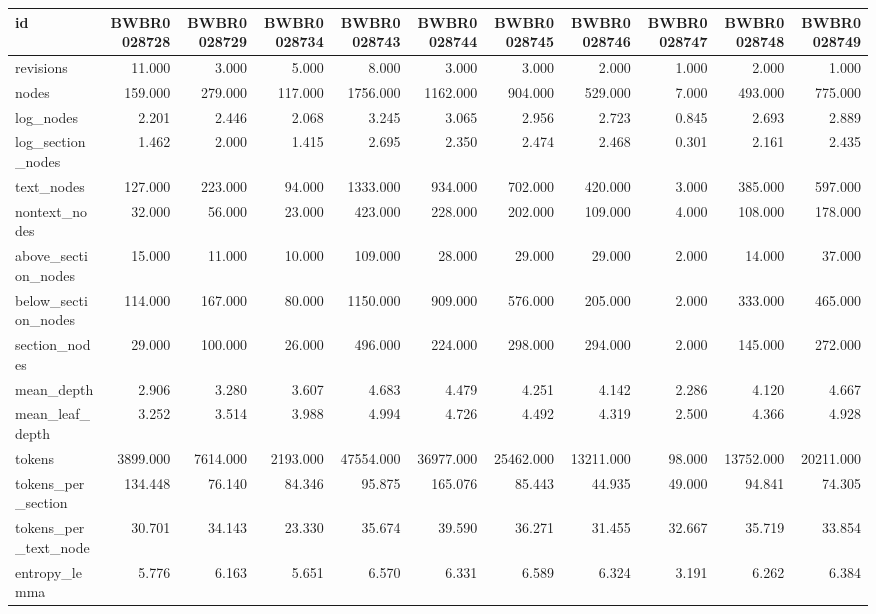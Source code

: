 \begin{tabular}{lrrrrrrrrrr}
\toprule
id & BWBR0028728 & BWBR0028729 & BWBR0028734 & BWBR0028743 & BWBR0028744 & BWBR0028745 & BWBR0028746 & BWBR0028747 & BWBR0028748 & BWBR0028749 \\
\midrule
revisions & 11.000 & 3.000 & 5.000 & 8.000 & 3.000 & 3.000 & 2.000 & 1.000 & 2.000 & 1.000 \\
\cline{1-11}
nodes & 159.000 & 279.000 & 117.000 & 1756.000 & 1162.000 & 904.000 & 529.000 & 7.000 & 493.000 & 775.000 \\
\cline{1-11}
log\_nodes & 2.201 & 2.446 & 2.068 & 3.245 & 3.065 & 2.956 & 2.723 & 0.845 & 2.693 & 2.889 \\
\cline{1-11}
log\_section\_nodes & 1.462 & 2.000 & 1.415 & 2.695 & 2.350 & 2.474 & 2.468 & 0.301 & 2.161 & 2.435 \\
\cline{1-11}
text\_nodes & 127.000 & 223.000 & 94.000 & 1333.000 & 934.000 & 702.000 & 420.000 & 3.000 & 385.000 & 597.000 \\
\cline{1-11}
nontext\_nodes & 32.000 & 56.000 & 23.000 & 423.000 & 228.000 & 202.000 & 109.000 & 4.000 & 108.000 & 178.000 \\
\cline{1-11}
above\_section\_nodes & 15.000 & 11.000 & 10.000 & 109.000 & 28.000 & 29.000 & 29.000 & 2.000 & 14.000 & 37.000 \\
\cline{1-11}
below\_section\_nodes & 114.000 & 167.000 & 80.000 & 1150.000 & 909.000 & 576.000 & 205.000 & 2.000 & 333.000 & 465.000 \\
\cline{1-11}
section\_nodes & 29.000 & 100.000 & 26.000 & 496.000 & 224.000 & 298.000 & 294.000 & 2.000 & 145.000 & 272.000 \\
\cline{1-11}
mean\_depth & 2.906 & 3.280 & 3.607 & 4.683 & 4.479 & 4.251 & 4.142 & 2.286 & 4.120 & 4.667 \\
\cline{1-11}
mean\_leaf\_depth & 3.252 & 3.514 & 3.988 & 4.994 & 4.726 & 4.492 & 4.319 & 2.500 & 4.366 & 4.928 \\
\cline{1-11}
tokens & 3899.000 & 7614.000 & 2193.000 & 47554.000 & 36977.000 & 25462.000 & 13211.000 & 98.000 & 13752.000 & 20211.000 \\
\cline{1-11}
tokens\_per\_section & 134.448 & 76.140 & 84.346 & 95.875 & 165.076 & 85.443 & 44.935 & 49.000 & 94.841 & 74.305 \\
\cline{1-11}
tokens\_per\_text\_node & 30.701 & 34.143 & 23.330 & 35.674 & 39.590 & 36.271 & 31.455 & 32.667 & 35.719 & 33.854 \\
\cline{1-11}
entropy\_lemma & 5.776 & 6.163 & 5.651 & 6.570 & 6.331 & 6.589 & 6.324 & 3.191 & 6.262 & 6.384 \\

\end{tabular}
